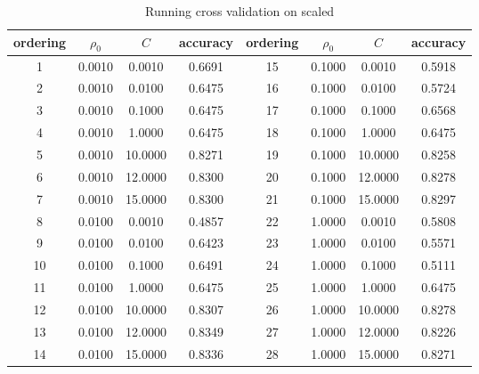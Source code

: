 \documentclass[12pt, fullpage,letterpaper]{article}
\begin{document}
\begin{enumerate}
\begin{table}[h] 
    \centering
    \begin{tabular}{|c|c|c|c|c|c|c|c|}
    \hline
  ordering  &$\rho_0$& $C$ & accuracy & ordering &  $\rho_0$& $C$ & accuracy \\
    \hline
  1 & 0.0010 & 0.0010 & 0.6691 & 15 & 0.1000 & 0.0010 & 0.5918  \\
  2 & 0.0010 & 0.0100 & 0.6475 & 16 & 0.1000 & 0.0100 & 0.5724  \\
  3 & 0.0010 & 0.1000 & 0.6475 & 17 & 0.1000 & 0.1000 & 0.6568  \\
  4 & 0.0010 & 1.0000 & 0.6475 & 18 & 0.1000 & 1.0000 & 0.6475  \\
  5 & 0.0010 & 10.0000 & 0.8271 & 19 & 0.1000 & 10.0000 & 0.8258  \\
  6 & 0.0010 & 12.0000 & 0.8300 & 20 & 0.1000 & 12.0000 & 0.8278  \\
  7 & 0.0010 & 15.0000 & 0.8300 & 21 & 0.1000 & 15.0000 & 0.8297  \\
  8 & 0.0100 & 0.0010 & 0.4857 & 22 & 1.0000 & 0.0010 & 0.5808  \\
  9 & 0.0100 & 0.0100 & 0.6423 & 23 & 1.0000 & 0.0100 & 0.5571  \\
  10 & 0.0100 & 0.1000 & 0.6491 & 24 & 1.0000 & 0.1000 & 0.5111  \\
  11 & 0.0100 & 1.0000 & 0.6475 & 25 & 1.0000 & 1.0000 & 0.6475  \\
  12 & 0.0100 & 10.0000 & 0.8307 & 26 & 1.0000 & 10.0000 & 0.8278  \\
  13 & 0.0100 & 12.0000 & 0.8349 & 27 & 1.0000 & 12.0000 & 0.8226  \\
  14 & 0.0100 & 15.0000 & 0.8336 & 28 & 1.0000 & 15.0000 & 0.8271  \\
      \hline
    \end{tabular}
    \caption{Running cross validation on scaled }\label{t:6}
  \end{table}



\end{enumerate}
\end{document}
